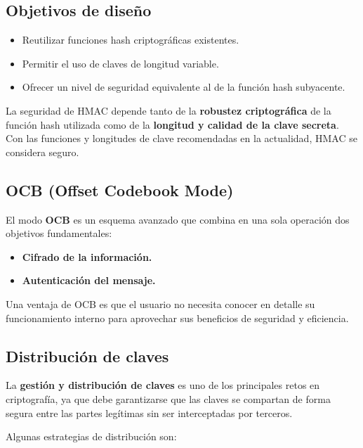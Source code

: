 \documentclass[11pt,a4paper]{article}
\begin{document}
\subsection*{Objetivos de diseño}
\begin{itemize}
    \item Reutilizar funciones hash criptográficas existentes.
    \item Permitir el uso de claves de longitud variable.
    \item Ofrecer un nivel de seguridad equivalente al de la función hash subyacente.
\end{itemize}

\begin{DefBox}
La seguridad de HMAC depende tanto de la \textbf{robustez criptográfica} de la función hash utilizada como de la \textbf{longitud y calidad de la clave secreta}.
Con las funciones y longitudes de clave recomendadas en la actualidad, HMAC se considera seguro.
\end{DefBox}

\subsection{OCB (Offset Codebook Mode)}

El modo \textbf{OCB} es un esquema avanzado que combina en una sola operación dos objetivos fundamentales:
\begin{itemize}
    \item \textbf{Cifrado de la información.}
    \item \textbf{Autenticación del mensaje.}
\end{itemize}

\begin{NotaBox}
Una ventaja de OCB es que el usuario no necesita conocer en detalle su funcionamiento interno para aprovechar sus beneficios de seguridad y eficiencia.
\end{NotaBox}

\subsection{Distribución de claves}

La \textbf{gestión y distribución de claves} es uno de los principales retos en criptografía, ya que debe garantizarse que las claves se compartan de forma segura entre las partes legítimas sin ser interceptadas por terceros.

Algunas estrategias de distribución son:
\end{document}
